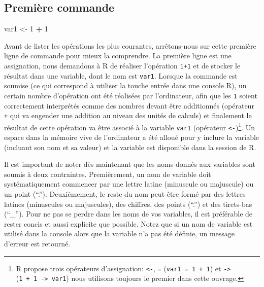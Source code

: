 \documentclass[]{article}
\newenvironment{Shaded}{\begin{snugshade}}{\end{snugshade}}
\newcommand{\DecValTok}[1]{\textcolor[rgb]{0.00,0.00,0.81}{#1}}
\newcommand{\NormalTok}[1]{#1}
\newcommand{\OperatorTok}[1]{\textcolor[rgb]{0.81,0.36,0.00}{\textbf{#1}}}
\newcommand{\StringTok}[1]{\textcolor[rgb]{0.31,0.60,0.02}{#1}}
\begin{document}
\hypertarget{premiuxe8re-commande}{%
\subsection*{Première commande}\label{premiuxe8re-commande}}

\begin{Shaded}
\begin{Highlighting}[]
\NormalTok{var1 <-}\StringTok{ }\DecValTok{1} \OperatorTok{+}\StringTok{ }\DecValTok{1}
\end{Highlighting}
\end{Shaded}

Avant de lister les opérations les plus courantes, arrêtons-nous sur cette
première ligne de commande pour mieux la comprendre. La première ligne est une
assignation, nous demandons à R de réaliser l'opération \texttt{1+1} et de stocker le
résultat dans une variable, dont le nom est \texttt{var1}. Lorsque la commande est
soumise (ce qui correspond à utiliser la touche entrée dans une console R), un
certain nombre d'opération ont été réalisées par l'ordinateur, afin que les
\texttt{1} soient correctement interprétés comme des nombres devant être additionnés
(opérateur \texttt{+} qui va engender une addition au niveau des unités de calculs)
et finalement le résultat de cette opération va être associé à la variable
\texttt{var1} (opérateur \texttt{\textless{}-})\footnote{R propose trois opérateurs d'assignation: \texttt{\textless{}-}, \texttt{=} (\texttt{var1\ =\ 1\ +\ 1})
  et \texttt{-\textgreater{}} (\texttt{1\ +\ 1\ -\textgreater{}\ var1}) nous utilisons toujours le premier dans cette ouvrage.}. Un espace dans la mémoire vive de l'ordinateur
a été alloué pour y inclure la variable (incluant son nom et sa valeur) et la
variable est disponible dans la session de R.

Il est important de noter dès maintenant que les noms donnés aux variables sont
soumis à deux contraintes. Premièrement, un nom de variable doit systématiquement
commencer par une lettre latine (minuscule ou majuscule) ou un point (``.'').
Deuxièmement, le reste du nom peut-être formé par des lettres latines (minuscules
ou majuscules), des chiffres, des points (``.'') et des tirets-bas (``\_''). Pour
ne pas se perdre dans les noms de vos variables, il est préférable de rester
concis et aussi explicite que possible. Notez que si un nom de variable est
utilisé dans la console alors que la variable n'a pas été définie, un message
d'erreur est retourné.
\end{document}
